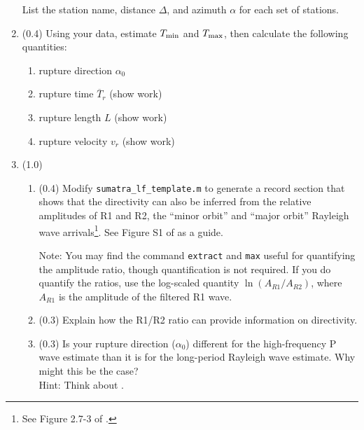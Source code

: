 \documentclass[11pt,titlepage,fleqn]{article}
\begin{document}
\begin{enumerate}
List the station name, distance $\Delta$, and azimuth $\alpha$ for each set of stations.



\item (0.4) Using your data, estimate $T_{\rm min}$ and $T_{\rm max}$, then calculate the following quantities:
%
\begin{enumerate}
\item rupture direction $\alpha_0$
\item rupture time $\overline{T}_r$ (show work)
\item rupture length $L$ (show work)
\item rupture velocity $v_r$ (show work)
\end{enumerate}


\item (1.0)
%
\begin{enumerate}
\item (0.4) Modify \verb+sumatra_lf_template.m+ to generate a record section that shows that the directivity can also be inferred from the relative amplitudes of R1 and R2, the ``minor orbit'' and ``major orbit'' Rayleigh wave arrivals\footnote{See Figure 2.7-3 of \citet{SteinWysession}.}. See Figure S1 of \citet{Ammon2005} as a guide.

Note: You may find the command \verb+extract+ and \verb+max+ useful for quantifying the amplitude ratio, though quantification is not required. If you do quantify the ratios, use the log-scaled quantity $\ln(A_{R1}/A_{R2})$, where $A_{R1}$ is the amplitude of the filtered R1 wave.

\item (0.3) Explain how the R1/R2 ratio can provide information on directivity.

\item (0.3) Is your rupture direction ($\alpha_0$) different for the high-frequency P wave estimate than it is for the long-period Rayleigh wave estimate. Why might this be the case? \\
Hint: Think about .
\end{enumerate}

\end{enumerate}
\end{document}
